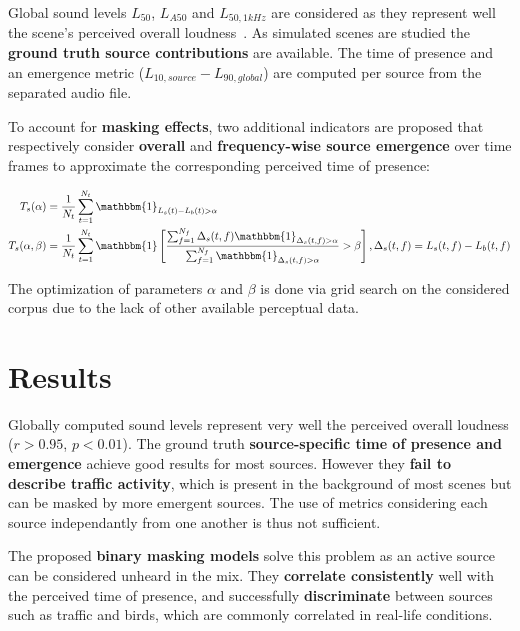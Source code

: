 \documentclass[a0,portrait]{a0poster}
\begin{document}
\begin{multicols}{2}
Global sound levels $L_{50}$, $L_{A50}$ and $L_{50, 1kHz}$ are considered as they represent well the scene's perceived overall loudness~\cite{aumond2017}. As simulated scenes are studied the \textbf{ground truth source contributions} are available. The time of presence and an emergence metric ($L_{10, source}-L_{90, global}$) are computed per source from the separated audio file.

To account for \textbf{masking effects}, two additional indicators are proposed that respectively consider \textbf{overall} and \textbf{frequency-wise source emergence} over time frames to approximate the corresponding perceived time of presence:

\begin{align}
T_s(\alpha) &= \frac{1}{N_t}\sum_{t = 1}^{N_t}\mathbbm{1}_{L_s(t) - L_b(t)>\alpha} \\
T_s(\alpha, \beta) &= \frac{1}{N_t}\sum_{t = 1}^{N_t}\mathbbm{1}\left[ \frac{\sum_{f = 1}^{N_f}\Delta_s(t, f)\mathbbm{1}_{\Delta_s(t, f)>\alpha}}{\sum_{f = 1}^{N_f}\mathbbm{1}_{\Delta_s(t, f)>\alpha}}>\beta \right], \Delta_s(t, f) = L_s(t, f) - L_b(t, f)
\end{align}

The optimization of parameters $\alpha$ and $\beta$ is done via grid search on the considered corpus due to the lack of other available perceptual data.

\section*{Results}

Globally computed sound levels represent very well the perceived overall loudness ($r>0.95$, $p<0.01$). The ground truth \textbf{source-specific time of presence and emergence} achieve good results for most sources. However they \textbf{fail to describe traffic activity}, which is present in the background of most scenes but can be masked by more emergent sources. The use of metrics considering each source independantly from one another is thus not sufficient.

The proposed \textbf{binary masking models} solve this problem as an active source can be considered unheard in the mix. They \textbf{correlate consistently} well with the perceived time of presence, and successfully \textbf{discriminate} between sources such as traffic and birds, which are commonly correlated in real-life conditions.


\end{multicols}
\end{document}
